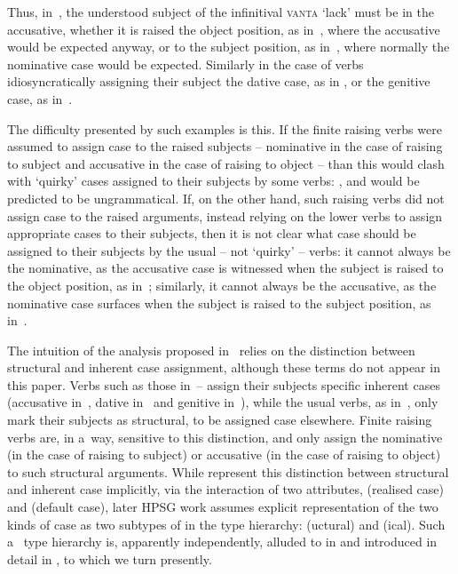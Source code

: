 \documentclass[output=paper]{langsci/langscibook}
\begin{document}
Thus, in~, the understood subject of the infinitival \textsc{vanta} ‘lack’ must be in the accusative, whether it is raised the object position, as in~, where the accusative would be expected anyway, or to the subject position, as in~, where normally the nominative case would be expected.  Similarly in the case of verbs idiosyncratically assigning their subject the dative case, as in , or the genitive case, as in~.

The difficulty presented by such examples is this. If the finite raising verbs were assumed to assign case to the raised subjects – nominative in the case of raising to subject and accusative in the case of raising to object – than this would clash with ‘quirky’ cases assigned to their subjects by some verbs: ,  and  would be predicted to be ungrammatical.  If, on the other hand, such raising verbs did not assign case to the raised arguments, instead relying on the lower verbs to assign appropriate cases to their subjects, then it is not clear what case should be assigned to their subjects by the usual – not ‘quirky’ – verbs: it cannot always be the nominative, as the accusative case is witnessed when the subject is raised to the object position, as in~; similarly, it cannot always be the accusative, as the nominative case surfaces when the subject is raised to the subject position, as in~.

The intuition of the analysis proposed in~\citealt{SKG92} relies on the distinction between structural and inherent case assignment, although these terms do not appear in this paper.  Verbs such as those in~– assign their subjects specific inherent cases (accusative in~, dative in~ and genitive in~), while the usual verbs, as in~, only mark their subjects as structural, to be assigned case elsewhere.  Finite raising verbs are, in a~way, sensitive to this distinction, and only assign the nominative (in the case of raising to subject) or accusative (in the case of raising to object) to such structural arguments.  While \citet{SKG92} represent this distinction between structural and inherent case implicitly, via the interaction of two attributes,  (realised case) and  (default case), later HPSG work assumes explicit representation of the two kinds of case as two subtypes of  in the type hierarchy: (uctural) and (ical).  Such a~ type hierarchy is, apparently independently, alluded to in \citealt{Pollard94a} and introduced in detail in \citealt{HM94a}, to which we turn presently.
\end{document}
